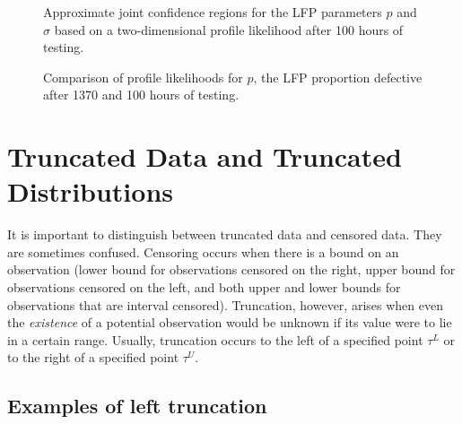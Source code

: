 \begin{figure}
\caption{Approximate joint confidence
regions for  the LFP parameters $p$ and $\sigma$ based on
a two-dimensional profile likelihood after 100 hours of testing.}
\label{figure:lfp.psigma.conf.contour.ps}
\end{figure}

\begin{figure}
\caption{Comparison of profile 
likelihoods for $p$, the LFP proportion
defective after 1370 and 100 hours of testing.}
\label{figure:lfp.p.profile.comparison.ps}
\end{figure}

\section{Truncated Data and Truncated Distributions}
\label{section:truncated.data}

It is important to distinguish between truncated data and censored
data.  They are sometimes confused. Censoring occurs when there is a
bound on an observation (lower bound for observations censored on the
right, upper bound for observations censored on the left, and both
upper and lower bounds for observations that are interval censored).
Truncation, however, arises when even the {\em existence} of a
potential observation would be unknown if its value were to lie in a
certain range. Usually, truncation occurs to the left of a specified
point $\tau^{L}$ or to the right of a specified point $\tau^{U}$.


\subsection{Examples of left truncation}

